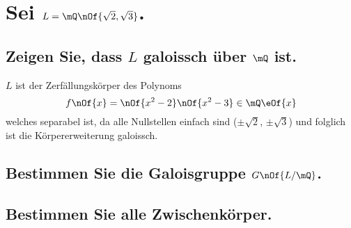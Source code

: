 \section{Sei $L = \mQ\nOf{\sqrt{2},\sqrt{3}}$.}
\subsection{Zeigen Sie, dass $L$ galoissch über $\mQ$ ist.}
$L$ ist der Zerfällungskörper des Polynoms
\begin{equation}
	f\nOf{x} = \nOf{x^2-2}\nOf{x^2-3} \in \mQ\eOf{x}
\end{equation}
welches separabel ist, da alle Nullstellen einfach sind ($\pm\sqrt{2}$, $\pm\sqrt{3}$) und folglich ist die Körpererweiterung galoissch.

\subsection{Bestimmen Sie die Galoisgruppe $G\nOf{L/\mQ}$.}


\subsection{Bestimmen Sie alle Zwischenkörper.}

